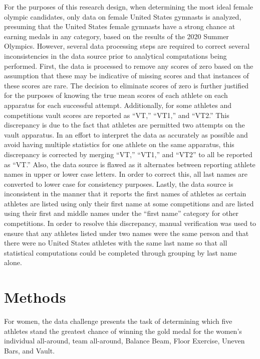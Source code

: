 \documentclass[12pt]{article}
\begin{document}
For the purposes of this research design, when determining the most ideal female olympic candidates, 
only data on female United States gymnasts is analyzed, presuming that the United States 
female gymnasts have a strong chance at earning medals in any category, based on the results of the 2020 Summer Olympics. 
However, several data processing steps are required to correct several inconsistencies in the data source prior to 
analytical computations being performed.
First, the data is processed to remove any scores of zero based on the assumption that these may 
be indicative of missing scores and that instances of these scores are rare. The decision to eliminate scores of 
zero is further justified for the purposes of knowing the true mean scores of each athlete on each 
apparatus for each successful attempt. Additionally, for some athletes and competitions vault
scores are reported as ``VT,'' ``VT1,'' and ``VT2.'' This discrepancy is due to the fact that athletes are permitted
two attempts on the vault apparatus. In an effort to interpret the data as accurately as possible and avoid having 
multiple statistics for one athlete on the same apparatus, this discrepancy is corrected by merging ``VT,'' ``VT1,'' and 
``VT2'' to all be reported as ``VT.'' Also, the data source is flawed as it alternates between reporting athlete names
in upper or lower case letters. In order to correct this, all last names are converted to lower case for consistency 
purposes. Lastly, the data source is inconsistent in the manner that it reports the first names of athletes as certain
athletes are listed using only their first name at some competitions and are listed using their first and middle names 
under the ``first name'' category for other competitions. In order to resolve this discrepancy, manual verification was used
to ensure that any athletes listed under two names were the same person and that there were no United States  
athletes with the same last name so that all statistical computations could be completed through grouping by last 
name alone.


\section{Methods}
\label{sec:meth}

For women, the data challenge presents the task of determining 
which five athletes stand the greatest chance of winning the gold medal for the women's individual all-around,
team all-around, Balance Beam, Floor Exercise, Uneven Bars, and Vault. 
\end{document}
